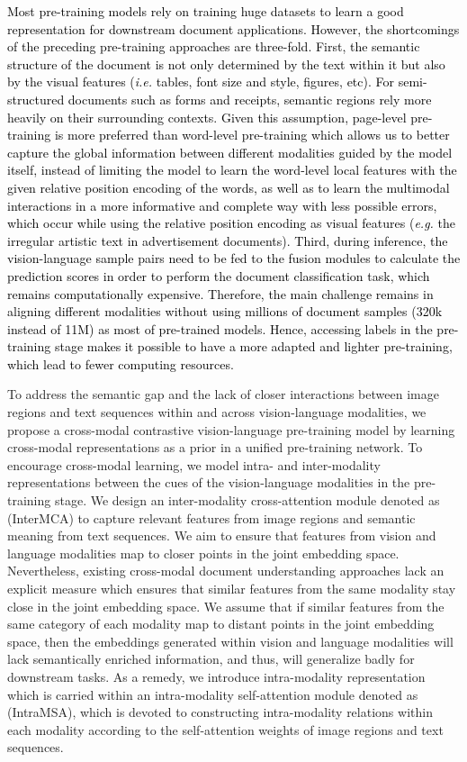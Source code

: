 \documentclass[preprint,review,12pt]{elsarticle}
\newcommand{\ie}{\textit{i.e. }}
\newcommand{\eg}{\textit{e.g. }}
\begin{document}
\textcolor{black}{Most pre-training models rely on training huge datasets to learn a good representation for downstream document applications. However, the shortcomings of the preceding pre-training approaches are three-fold. First, the semantic structure of the document is not only determined by the text within it but also by the visual features (\ie tables, font size and style, figures, etc). For semi-structured documents such as forms and receipts, semantic regions rely more heavily on their surrounding contexts. Given this assumption, page-level pre-training is more preferred than word-level pre-training which allows us to better capture the global information between different modalities guided by the model itself, instead of limiting the model to learn the word-level local features with the given relative position encoding of the words, as well as to learn the multimodal interactions in a more informative and complete way with less possible errors, which occur while using the relative position encoding as visual features (\eg the irregular artistic text in advertisement documents).
Third, during inference, the vision-language sample pairs need to be fed to the fusion modules to calculate the prediction scores in order to perform the document classification task, which remains computationally expensive.} \textcolor{black}{Therefore, the main challenge remains in aligning different modalities without using millions of document samples (320k instead of 11M) as most of pre-trained models. Hence, accessing labels in the pre-training stage makes it possible to have a more adapted and lighter pre-training, which lead to fewer computing resources.}


To address the semantic gap and the lack of closer interactions between image regions and text sequences within and across vision-language modalities, we propose a cross-modal contrastive vision-language pre-training model by learning cross-modal representations as a prior in a unified pre-training network. To encourage cross-modal learning, we model intra- and inter-modality representations between the cues of the vision-language modalities in the pre-training stage. We design an inter-modality cross-attention module denoted as (InterMCA) to capture relevant features from image regions and semantic meaning from text sequences. We aim to ensure that features from vision and language modalities map to closer points in the joint embedding space. Nevertheless, existing cross-modal document understanding approaches lack an explicit measure which ensures that similar features from the same modality stay close in the joint embedding space. We assume that if similar features from the same category of each modality map to distant points in the joint embedding space, then the embeddings generated within vision and language modalities will lack semantically enriched information, and thus, will generalize badly for downstream tasks. As a remedy, we introduce intra-modality representation which is carried within an intra-modality self-attention module denoted as (IntraMSA), which is devoted to constructing intra-modality relations within each modality according to the self-attention weights of image regions and text sequences.
\end{document}
